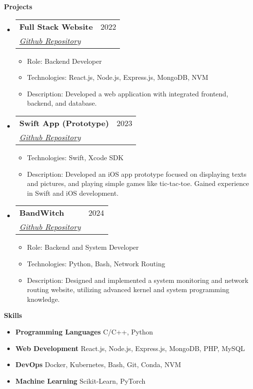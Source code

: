 \documentclass[letterpaper,12pt]{article}[leftmargin=*]
\makeatletter
\def \entryspacing {-0pt}
\renewcommand{\section}[2]{\vspace{5pt}
  \colorbox{secondary}{\color{white}\raggedbottom\normalsize\textbf{{#1}{\hspace{7pt}#2}}}
}
\newcommand{\resumeEntryStart}{\begin{itemize}[leftmargin=2.5mm]}
\newcommand{\resumeEntryEnd}{\end{itemize}\vspace{\entryspacing}}
\newcommand{\resumeItemListStart}{\begin{itemize}[leftmargin=4.5mm]}
\newcommand{\resumeItemListEnd}{\end{itemize}}
\newcommand{\resumeItem}[1]{
  \item\small{
    {#1 \vspace{-2pt}}
  }
}
\newcommand{\resumeEntryTSDL}[4]{
  \vspace{-1pt}\item[]
    \begin{tabularx}{0.97\textwidth}{X@{\hspace{60pt}}r}
      \textbf{\color{primary}#1} & {\firabook\color{accent}\small#2} \\
      \textit{\color{accent}\small#3} & \textit{\color{accent}\small#4} \\
    \end{tabularx}\vspace{-6pt}
}
\newcommand{\resumeEntryS}[2]{
  \item[]\small{
    \textbf{\color{primary}#1 }{ #2 \vspace{-6pt}}
  }
}
\makeatother
\begin{document}
\section{\faFlask}{Projects}

  \resumeEntryStart
    \resumeEntryTSDL
      {Full Stack Website}{2022}
      {\href{https://github.com/YuXiangLo/full-stack-web}{Github Repository}}{}
    \resumeItemListStart
      \resumeItem {Role: Backend Developer}
      \resumeItem {Technologies: React.js, Node.js, Express.js, MongoDB, NVM}
      \resumeItem {Description: Developed a web application with integrated frontend, backend, 
      and database.}
    \resumeItemListEnd
  \resumeEntryEnd

  \resumeEntryStart
    \resumeEntryTSDL
      {Swift App (Prototype)}{2023}
      {\href{https://github.com/YuXiangLo/swift}{Github Repository}}{}
    \resumeItemListStart
      \resumeItem {Technologies: Swift, Xcode SDK}
      \resumeItem {Description: Developed an iOS app prototype focused on displaying texts and pictures, and playing simple games like tic-tac-toe. Gained experience in Swift and iOS development.}
    \resumeItemListEnd
  \resumeEntryEnd

  \resumeEntryStart
    \resumeEntryTSDL
      {BandWitch}{2024}
      {\href{https://github.com/YuXiangLo/bandwitch}{Github Repository}}{}
    \resumeItemListStart
      \resumeItem {Role: Backend and System Developer}
      \resumeItem {Technologies: Python, Bash, Network Routing}
      \resumeItem {Description: Designed and implemented a system monitoring and network routing website, utilizing advanced kernel and system programming knowledge.}
    \resumeItemListEnd
  \resumeEntryEnd

  
\section{\faGears}{Skills}
 \resumeEntryStart
  \resumeEntryS{Programming Languages } {C/C++, Python}
  \resumeEntryS{Web Development } {React.js, Node.js, Express.js, MongoDB, PHP, MySQL}
  \resumeEntryS{DevOps } {Docker, Kubernetes, Bash, Git, Conda, NVM}
  \resumeEntryS{Machine Learning } {Scikit-Learn, PyTorch}
 \resumeEntryEnd
\end{document}
